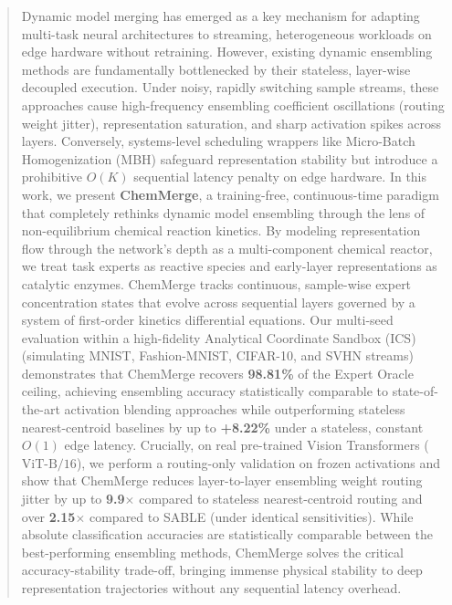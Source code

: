 \begin{abstract}
Dynamic model merging has emerged as a key mechanism for adapting multi-task neural architectures to streaming, heterogeneous workloads on edge hardware without retraining. 
However, existing dynamic ensembling methods are fundamentally bottlenecked by their stateless, layer-wise decoupled execution. 
Under noisy, rapidly switching sample streams, these approaches cause high-frequency ensembling coefficient oscillations (routing weight jitter), representation saturation, and sharp activation spikes across layers. 
Conversely, systems-level scheduling wrappers like Micro-Batch Homogenization (MBH) safeguard representation stability but introduce a prohibitive $O(K)$ sequential latency penalty on edge hardware. 
In this work, we present \textbf{ChemMerge}, a training-free, continuous-time paradigm that completely rethinks dynamic model ensembling through the lens of non-equilibrium chemical reaction kinetics. 
By modeling representation flow through the network's depth as a multi-component chemical reactor, we treat task experts as reactive species and early-layer representations as catalytic enzymes. 
ChemMerge tracks continuous, sample-wise expert concentration states that evolve across sequential layers governed by a system of first-order kinetics differential equations. 
Our multi-seed evaluation within a high-fidelity Analytical Coordinate Sandbox (ICS) (simulating MNIST, Fashion-MNIST, CIFAR-10, and SVHN streams) demonstrates that ChemMerge recovers \textbf{98.81\%} of the Expert Oracle ceiling, achieving ensembling accuracy statistically comparable to state-of-the-art activation blending approaches while outperforming stateless nearest-centroid baselines by up to \textbf{+8.22\%} under a stateless, constant $O(1)$ edge latency. 
Crucially, on real pre-trained Vision Transformers ($\text{ViT-B/16}$), we perform a routing-only validation on frozen activations and show that ChemMerge reduces layer-to-layer ensembling weight routing jitter by up to \textbf{9.9$\times$} compared to stateless nearest-centroid routing and over \textbf{2.15$\times$} compared to SABLE (under identical sensitivities). 
While absolute classification accuracies are statistically comparable between the best-performing ensembling methods, ChemMerge solves the critical accuracy-stability trade-off, bringing immense physical stability to deep representation trajectories without any sequential latency overhead.
\end{abstract}
